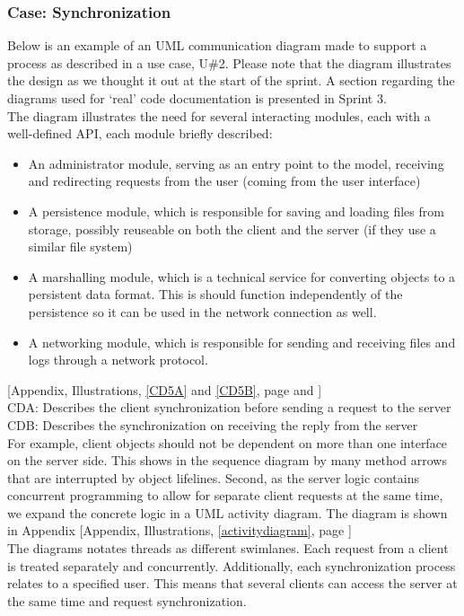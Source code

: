 \subsubsection{Case: Synchronization}
Below is an example of an UML communication diagram made to support a process as described in a use case, U\#2. Please note that the diagram illustrates the design as we thought it out at the start of the sprint. A section regarding the diagrams used for ‘real’ code documentation is presented in Sprint 3. \\
The diagram illustrates the need for several interacting modules, each with a well-defined API, each module briefly described:\\
\begin{itemize}
\item An administrator module, serving as an entry point to the model, receiving and redirecting requests from the user (coming from the user interface)
\item A persistence module, which is responsible for saving and loading files from storage, possibly reuseable on both the client and the server (if they use a similar file system)
\item A marshalling module, which is a technical service for converting objects to a persistent data format. This is should function independently of the persistence so it can be used in the network connection as well.
\item A networking module, which is responsible for sending and receiving files and logs through a network protocol.
\end{itemize}
[Appendix, Illustrations, \ref{CD5A} and \ref{CD5B}, page \pageref{CD5A} and \pageref{CD5B}]\\
\newline
CDA: Describes the client synchronization before sending a request to the server\\
CDB: Describes the synchronization on receiving the reply from the server\\
\newline
For example, client objects should not be dependent on more than one interface on the server side. This shows in the sequence diagram by many method arrows that are interrupted by object lifelines. Second, as the server logic contains concurrent programming to allow for separate client requests at the same time, we expand the concrete logic in a UML activity diagram. The diagram is shown in Appendix [Appendix, Illustrations, \ref{activitydiagram}, page \pageref{activitydiagram}]\\
\newline
The diagrams notates threads as different swimlanes. Each request from a client is treated separately and concurrently. Additionally, each synchronization process relates to a specified user. This means that several clients can access the server at the same time and request synchronization.\\
